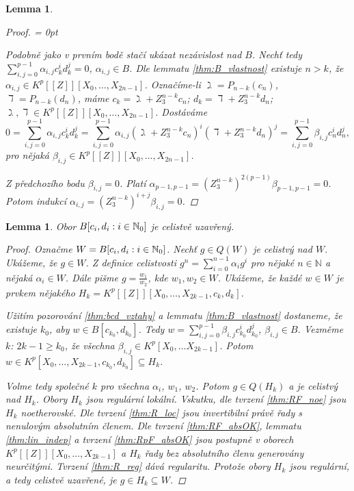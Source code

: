 \documentclass[11pt,a4paper]{article}
\newcommand\m[1]{\mathbb { #1 }} %
\newcommand\N{\m N}
\newcommand*{\mld}[1]{\[#1\]} %
\newenvironment{items}{%
	\itemize
	\itemsep = 0pt%
}{%
	\enditemize
}
\newcounter{numb}
\theoremstyle{definition}
\theoremstyle{plain}
\newtheorem{lemma}[numb]{Lemma}
\begin{document}
\begin{lemma}
\begin{proof}
\begin{items}
			\newcommand*{\J}{_{i, j = 0}^{p - 1}}
			\item Podobně jako v prvním bodě stačí ukázat nezávislost nad $B$. Nechť tedy $\sum\J \alpha_{i, j} c_k^i d_k^j = 0$, $\alpha_{i, j} \in B$. Dle lemmatu \ref{thm:B_vlastnost} existuje $n > k$, že $\alpha_{i, j} \in K^p[[Z]][X_0, \hdots, X_{2n - 1}]$. Označíme-li $\gimel = P_{n - k}(c_n)$, $\daleth = P_{n - k}(d_n)$, máme $c_k = \gimel + Z_3^{n - k} c_n$; $d_k = \daleth + Z_3^{n - k} d_n$; $\gimel, \daleth \in K^p[[Z]][X_0, \hdots, X_{2n - 1}]$. Dostáváme
			\mld{
				0 = \sum\J \alpha_{i, j} c_k^i d_k^j = \sum\J \alpha_{i, j} (\gimel + Z_3^{n - k} c_n)^i (\daleth + Z_3^{n - k} d_n)^j = \sum\J \beta_{i, j} c_n^i d_n^j,
			}
			pro nějaká $\beta_{i, j} \in K^p[[Z]][X_0, \hdots, X_{2n - 1}]$.

			Z předchozího bodu $\beta_{i, j} = 0$. Platí $\alpha_{p - 1, p - 1} = (Z_3^{n - k})^{2(p - 1)} \beta_{p - 1, p - 1} = 0$. Potom indukcí $\alpha_{i, j} = (Z_3^{n - k})^{i + j} \beta_{i, j} = 0$.
			\qedhere
		\end{items}
	\end{proof}
\end{lemma}

\begin{lemma} \label{thm:Bcdall_icl}
	Obor $\Bcdall$ je celistvě uzavřený.
	
	\begin{proof}
		\newcommand*{\I}{_{i = 0}^{n - 1}}
		
		Označme $W = \Bcdall$. Nechť $g \in Q(W)$ je celistvý nad $W$. Ukážeme, že $g \in W$. Z definice celistvosti $g^n = \sum\I \alpha_i g^i$ pro nějaké $n \in \N$ a nějaká $\alpha_i \in W$. Dále pišme $g = \frac{w_1}{w_2}$, kde $w_1, w_2 \in W$. Ukážeme, že každé $w \in W$ je prvkem nějakého $H_k = K^p[[Z]][X_0, \hdots, X_{2k - 1}, c_k, d_k]$.
		
		Užitím pozorování \ref{thm:bcd_vztahy} a lemmatu \ref{thm:B_vlastnost} dostaneme, že existuje $k_0$, aby $w \in B[c_{k_0}, d_{k_0}]$. Tedy $w = \sum_{i, j = 0}^{p - 1} \beta_{i, j} c_{k_0}^i d_{k_0}^j$, $\beta_{i, j} \in B$. Vezměme $k$: $2k - 1 \geq k_0$, že všechna $\beta_{i, j} \in K^p[X_0, \hdots X_{2k - 1}]$. Potom $w \in K^p[X_0, \hdots, X_{2k - 1}, c_{k_0}, d_{k_0}] \subseteq H_k$.
		
		Volme tedy společné $k$ pro všechna $\alpha_i$, $w_1$, $w_2$. Potom $g \in Q(H_k)$ a je celistvý nad $H_k$. Obory $H_k$ jsou regulární lokální. Vskutku, dle tvrzení \ref{thm:RF_noe} jsou $H_k$ noetherovské. Dle tvrzení \ref{thm:R_loc} jsou invertibilní právě řady s nenulovým absolutním členem. Dle tvrzení \ref{thm:RF_absOK}, lemmatu \ref{thm:lin_indep} a tvrzení \ref{thm:RpF_absOK} jsou postupně v oborech $K^p[[Z]][X_0, \hdots, X_{2k - 1}]$ a $H_k$ řady bez absolutního členu generovány neurčitými. Tvrzení \ref{thm:R_reg} dává regularitu. Protože obory $H_k$ jsou regulární, a tedy celistvě uzavřené, je $g \in H_k \subseteq W$.
	\end{proof}
\end{lemma}
\end{document}
